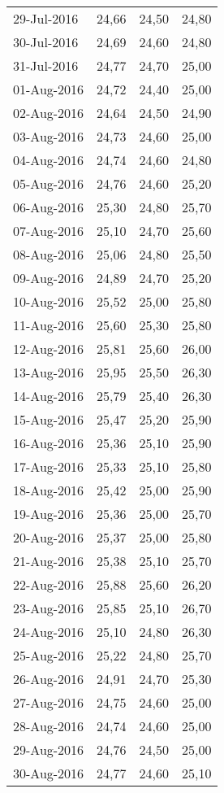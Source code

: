 \begin{longtable}{@{}l*{3}{S[table-format=2.2]}@{}}
29-Jul-2016 & 24,66 & 24,50 & 24,80 \\
30-Jul-2016 & 24,69 & 24,60 & 24,80 \\
31-Jul-2016 & 24,77 & 24,70 & 25,00 \\
01-Aug-2016 & 24,72 & 24,40 & 25,00 \\
02-Aug-2016 & 24,64 & 24,50 & 24,90 \\
03-Aug-2016 & 24,73 & 24,60 & 25,00 \\
04-Aug-2016 & 24,74 & 24,60 & 24,80 \\
05-Aug-2016 & 24,76 & 24,60 & 25,20 \\
06-Aug-2016 & 25,30 & 24,80 & 25,70 \\
07-Aug-2016 & 25,10 & 24,70 & 25,60 \\
08-Aug-2016 & 25,06 & 24,80 & 25,50 \\
09-Aug-2016 & 24,89 & 24,70 & 25,20 \\
10-Aug-2016 & 25,52 & 25,00 & 25,80 \\
11-Aug-2016 & 25,60 & 25,30 & 25,80 \\
12-Aug-2016 & 25,81 & 25,60 & 26,00 \\
13-Aug-2016 & 25,95 & 25,50 & 26,30 \\
14-Aug-2016 & 25,79 & 25,40 & 26,30 \\
15-Aug-2016 & 25,47 & 25,20 & 25,90 \\
16-Aug-2016 & 25,36 & 25,10 & 25,90 \\
17-Aug-2016 & 25,33 & 25,10 & 25,80 \\
18-Aug-2016 & 25,42 & 25,00 & 25,90 \\
19-Aug-2016 & 25,36 & 25,00 & 25,70 \\
20-Aug-2016 & 25,37 & 25,00 & 25,80 \\
21-Aug-2016 & 25,38 & 25,10 & 25,70 \\
22-Aug-2016 & 25,88 & 25,60 & 26,20 \\
23-Aug-2016 & 25,85 & 25,10 & 26,70 \\
24-Aug-2016 & 25,10 & 24,80 & 26,30 \\
25-Aug-2016 & 25,22 & 24,80 & 25,70 \\
26-Aug-2016 & 24,91 & 24,70 & 25,30 \\
27-Aug-2016 & 24,75 & 24,60 & 25,00 \\
28-Aug-2016 & 24,74 & 24,60 & 25,00 \\
29-Aug-2016 & 24,76 & 24,50 & 25,00 \\
30-Aug-2016 & 24,77 & 24,60 & 25,10 \\

\end{longtable}
